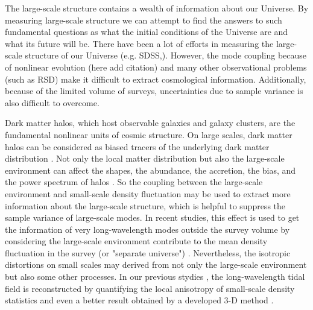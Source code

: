 The large-scale structure contains a wealth of information about our Universe.
By measuring large-scale structure we can attempt to
find the answers to such fundamental questions as what the initial
conditions of the Universe are and what its future will be.
{\color{red}There have been a lot of efforts in measuring the large-scale
structure of our Universe (e.g. SDSS,).} 
However, the mode coupling because of nonlinear evolution 
{\color{blue} (here add citation)} and many other observational
problems {\color{red}(such as RSD)} make it difficult to extract cosmological information. 
Additionally, because of the limited volume of surveys, uncertainties 
due to sample variance is also difficult to overcome.

Dark matter halos, which host observable galaxies and galaxy clusters, 
are the fundamental nonlinear units of cosmic structure. On large scales,
 dark matter halos can be considered as biased tracers 
of the underlying dark matter distribution \citep{1984ApJ...284L...9K}.
Not only the local matter distribution but also
the large-scale environment can affect the shapes, the abundance, 
the accretion, the bias, and the power spectrum of halos
\citep{2016ApJ...825...49C,2012JCAP...03..004S,1996MNRAS.282..347M,2015ApJ...807...37S,2015JCAP...09..028C,2014PhRvD..90j3530L,2014JCAP...05..048C,2013PhRvD..87l3504T}.
{\color{blue}
So the coupling between the large-scale environment and small-scale 
{\color{red}density fluctuation} may be used to extract more information about 
the large-scale structure, which is helpful to suppress the sample variance
of large-scale modes.}
In recent studies, this effect is used to get the 
information of very long-wavelength modes
outside the survey volume by considering the large-scale environment
contribute to the mean density fluctuation in the survey
(or "separate universe")
\citep{2016JCAP...09..007B,2016arXiv160901701C,2016PhRvD..93f3507L,2016JCAP...02..018L, 2015JCAP...08..042W,2003ApJ...585...34M}.
Nevertheless, the isotropic distortions on small scales may derived from
not only the large-scale environment but also some other processes.
In our previous stydies \citep{2012arXiv1202.5804P,2016PhRvD..93j3504Z},
the long-wavelength tidal field is reconstructed by quantifying the local
anisotropy of small-scale density statistics and even a better result
obtained by a developed 3-D method \citep{tides3d:Hu}.

